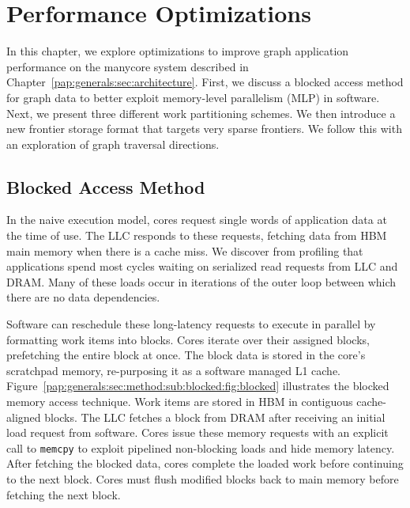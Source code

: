\chapter{Performance Optimizations}\label{gen:sec:optimizations}



In this chapter, we explore optimizations to improve graph application performance on the manycore system described in Chapter~\ref{pap:generals:sec:architecture}.
First, we discuss a blocked access method for graph data to better exploit memory-level parallelism (MLP) in software.
Next, we present three different work partitioning schemes.
We then introduce a new frontier storage format that targets very sparse frontiers. 
We follow this with an exploration of graph traversal directions.

\section{Blocked Access Method}\label{sec:method:sub:blocked}
In the naive execution model, cores request single words of application data at the time of use.
The LLC responds to these requests, fetching data from HBM main memory when there is a cache miss.
We discover from profiling that applications spend most cycles waiting on serialized read requests from LLC and DRAM.
Many of these loads occur in iterations of the outer loop between which there are no data dependencies.

\blockedMethodFigure

Software can reschedule these long-latency requests to execute in parallel by formatting work items into blocks.
Cores iterate over their assigned blocks, prefetching the entire block at once.
The block data is stored in the core's scratchpad memory, re-purposing it as a software managed L1 cache.
Figure~\ref{pap:generals:sec:method:sub:blocked:fig:blocked} illustrates the blocked memory access technique. 
Work items are stored in HBM in contiguous cache-aligned blocks.
The LLC fetches a block from DRAM after receiving an initial load request from software.
Cores issue these memory requests with an explicit call to \lstinline[language=C++, basicstyle=\small\ttfamily]{memcpy} to exploit pipelined non-blocking loads and hide memory latency.
After fetching the blocked data, cores complete the loaded work before continuing to the next block.
Cores must flush modified blocks back to main memory before fetching the next block.

